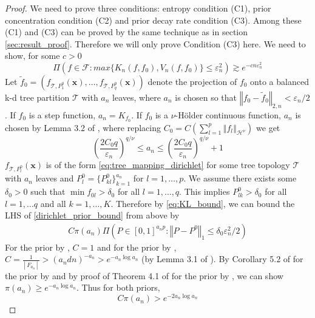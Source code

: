 \documentclass[12pt]{article}
\newcommand{\bm}[1]{\boldsymbol{#1}}
\newcommand{\mT}{\mathcal{T}}
\newcommand{\wt}[1]{\widetilde{#1}}
\newcommand{\norm}[1]{\left\Vert#1\right\Vert}
\newcommand{\1}{\mathbb{I}}
\def\C {\,|\:}
\def\C {\,|\:}
\def\x{\bm{x}}
\def\C{\mbox{\boldmath$C$}}
\def\x{\mbox{\boldmath$x$}}
\def\C {\,|\:}
\def\C {\,|\:}
\def\x{\bm{x}}
\theoremstyle{plain}
\theoremstyle{definition}
\theoremstyle{remark}
\begin{document}
\begin{proof}
We need to prove three conditions: entropy condition (C1), prior concentration condition (C2) and prior decay rate condition (C3). Among these (C1) and (C3) can be proved by the same technique as in section \ref{sec:result_proof}. Therefore we will only prove Condition (C3) here. We need to show, for some $c>0$
\begin{equation}\label{dirichlet_prior_bound}
\Pi \left (f \in \mathcal{F}: max \{K_n(f,f_0),V_n(f,f_0) \} \le \varepsilon_n^2 \right) \gtrsim e^{-c n \varepsilon_n^2}
\end{equation}
Let $\wt{f}_0 = \left (f_{\mT,{P_1^0}}(\x), \dots, f_{\mT,{P_q^0}}(\x) \right )$ denote the projection of $f_0$ onto a balanced k-d tree partition $\mT$ with $a_n$ leaves, where $a_n$ is chosen so that $\norm{f_0-\wt{f}_0}_{2,n} < \varepsilon_n/2$. If $f_0$ is a step function, $a_n=K_{f_0}$. If $f_0$ is a $\nu$-H\"{o}lder continuous function, $a_n$ is chosen by Lemma 3.2 of \cite{rockova2020posterior}, where replacing $C_0=C \left (\sum_{l=1}^{p} \norm{f_l}_{\mathcal{H}^\nu}\right)$ we get
\begin{equation}
\left (\frac{2C_0 q}{\varepsilon_n} \right)^{q/\nu} \le a_n \le \left (\frac{2C_0 q}{\varepsilon_n} \right)^{q/\nu} + 1
\end{equation}
$f_{\mT,{P^0_l}}(\x)$ is of the form \eqref{eq:tree_mapping_dirichlet} for some tree topology $\mT$ with $a_n$ leaves and $P^0_l=\{P_{kl}^0\}_{k=1}^{a_n}$ for $l=1,\dots,p$. We assume there exists some $\delta_0 > 0$ such that $\min{f_{0l}} > \delta_0$ for all $l=1,\dots,q$. This implies $P_{lk}^0 > \delta_0$ for all $l=1,\dots q$ and all $k=1,\dots,K$. Therefore by \eqref{eq:KL_bound}, we can bound the LHS of \eqref{dirichlet_prior_bound} from above by
\begin{align*}
C \pi(a_n) \Pi \left (P \in [0,1]^{a_np}: \norm{P-P^0}_1 \le \delta_0 \varepsilon_n^2/2 \right) 
\end{align*}
For the prior by \cite{chipman1998bayesian}, $C=1$  and for the prior by \cite{denison1998bayesian}, $C=\frac{1}{\C F_{a_n}\C} > (a_n d n)^{-a_n} > e^{-a_n \log a_n}$  (by Lemma 3.1 of \cite{rockova2020posterior}). By Corollary 5.2 of \cite{rockova2019theory} for the prior by \cite{chipman1998bayesian} and by proof of Theorem 4.1 of \cite{rockova2020posterior} for the prior by \cite{denison1998bayesian}, we can show $\pi(a_n) \ge e^{-a_n \log a_n}$. Thus for both priors,
\begin{equation}\label{eq:dirichlet_pi_bound}
    C\pi(a_n) > e^{-2a_n\log a_n}

\end{equation}
\end{proof}
\end{document}
